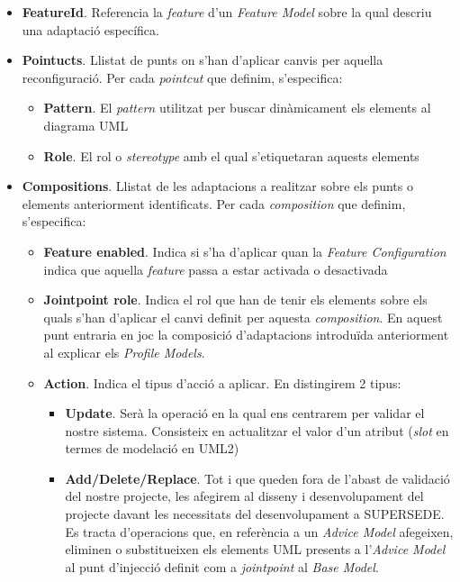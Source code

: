 \begin{itemize}
\item \textbf{FeatureId}. Referencia la \textit{feature} d'un \textit{Feature Model} sobre la qual descriu una adaptació específica.
\item \textbf{Pointucts}. Llistat de punts on s'han d'aplicar canvis per aquella reconfiguració. Per cada \textit{pointcut} que definim, s'especifica:
\begin{itemize}
\item \textbf{Pattern}. El \textit{pattern} utilitzat per buscar dinàmicament els elements al diagrama UML
\item \textbf{Role}. El rol o \textit{stereotype} amb el qual s'etiquetaran aquests elements
\end{itemize} 
\item \textbf{Compositions}. Llistat de les adaptacions a realitzar sobre els punts o elements anteriorment identificats. Per cada \textit{composition} que definim, s'especifica:
\begin{itemize}
\item \textbf{Feature enabled}. Indica si s'ha d'aplicar quan la \textit{Feature Configuration} indica que aquella \textit{feature} passa a estar activada o desactivada
\item \textbf{Jointpoint role}. Indica el rol que han de tenir els elements sobre els quals s'han d'aplicar el canvi definit per aquesta \textit{composition}. En aquest punt entraria en joc la composició d'adaptacions introduïda anteriorment al explicar els \textit{Profile Models}.
\item \textbf{Action}. Indica el tipus d'acció a aplicar. En distingirem 2 tipus:
\begin{itemize}
\item \textbf{Update}. Serà la operació en la qual ens centrarem per validar el nostre sistema. Consisteix en actualitzar el valor d'un atribut (\textit{slot} en termes de modelació en UML2)
\item \textbf{Add/Delete/Replace}. Tot i que queden fora de l'abast de validació del nostre projecte, les afegirem al disseny i desenvolupament del projecte davant les necessitats del desenvolupament a SUPERSEDE. Es tracta d'operacions que, en referència a un \textit{Advice Model} afegeixen, eliminen o substitueixen els elements UML presents a l'\textit{Advice Model} al punt d'injecció definit com a \textit{jointpoint} al \textit{Base Model}.
\end{itemize}
\end{itemize}
\end{itemize}

